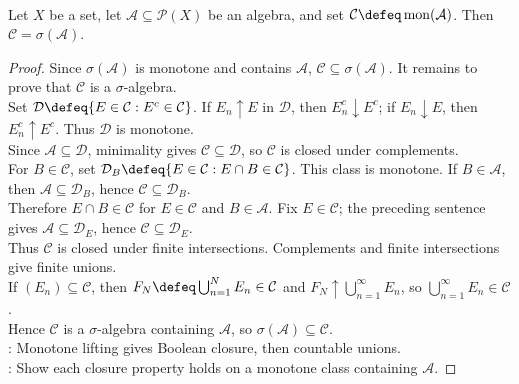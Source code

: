 \begin{theorem} \label{thm:monotone-class-theorem-algebras} \\
Let $X$ be a set, let $\mathcal{A}\subseteq\mathcal{P}(X)$ be an algebra, and set $\mathcal{C}\defeq\operatorname{mon}(\mathcal{A})$. Then $\mathcal{C}=\sigma(\mathcal{A})$.
\begin{proof} Since $\sigma(\mathcal{A})$ is monotone and contains $\mathcal{A}$, $\mathcal{C}\subseteq\sigma(\mathcal{A})$. It remains to prove that $\mathcal{C}$ is a $\sigma$-algebra.\\
Set $\mathcal{D}\defeq\{E\in\mathcal{C}:E^c\in\mathcal{C}\}$. If $E_n\uparrow E$ in $\mathcal{D}$, then $E_n^c\downarrow E^c$; if $E_n\downarrow E$, then $E_n^c\uparrow E^c$. Thus $\mathcal{D}$ is monotone.\\
Since $\mathcal{A}\subseteq\mathcal{D}$, minimality gives $\mathcal{C}\subseteq\mathcal{D}$, so $\mathcal{C}$ is closed under complements.\\
For $B\in\mathcal{C}$, set $\mathcal{D}_B\defeq\{E\in\mathcal{C}:E\cap B\in\mathcal{C}\}$. This class is monotone. If $B\in\mathcal{A}$, then $\mathcal{A}\subseteq\mathcal{D}_B$, hence $\mathcal{C}\subseteq\mathcal{D}_B$.\\
Therefore $E\cap B\in\mathcal{C}$ for $E\in\mathcal{C}$ and $B\in\mathcal{A}$. Fix $E\in\mathcal{C}$; the preceding sentence gives $\mathcal{A}\subseteq\mathcal{D}_E$, hence $\mathcal{C}\subseteq\mathcal{D}_E$.\\
Thus $\mathcal{C}$ is closed under finite intersections. Complements and finite intersections give finite unions.\\
If $(E_n)\subseteq\mathcal{C}$, then $F_N\defeq\bigcup_{n=1}^{N}E_n\in\mathcal{C}$ and $F_N\uparrow\bigcup_{n=1}^{\infty}E_n$, so $\bigcup_{n=1}^{\infty}E_n\in\mathcal{C}$.\\
Hence $\mathcal{C}$ is a $\sigma$-algebra containing $\mathcal{A}$, so $\sigma(\mathcal{A})\subseteq\mathcal{C}$.\\
: Monotone lifting gives Boolean closure, then countable unions.\\
: Show each closure property holds on a monotone class containing $\mathcal{A}$.
\end{proof}
\end{theorem}

